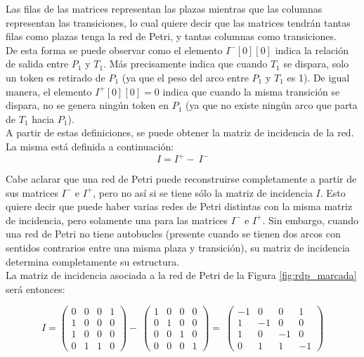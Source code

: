 Las filas de las matrices representan las plazas mientras que las columnas representan las transiciones, lo cual quiere decir que las matrices tendrán tantas filas como plazas tenga la red de Petri, y tantas columnas como transiciones.\\

De esta forma se puede observar como el elemento $I^-[0][0]$ indica la relación de salida entre $P_1$ y $T_1$. Más precisamente indica que cuando $T_1$ se dispara, solo un token es retirado de $P_1$ (ya que el peso del arco entre $P_1$ y $T_1$ es 1). De igual manera, el elemento $I^+[0][0] = 0$ indica que cuando la misma transición se dispara, no se genera ningún token en $P_1$ (ya que no existe ningún arco que parta de $T_1$ hacia $P_1$).\\

A partir de estas definiciones, se puede obtener la matriz de incidencia de la red. La misma está definida a continuación:\\

\begin{equation} I = I^+ -\ I^- \end{equation}

Cabe aclarar que una red de Petri puede reconstruirse completamente a partir de sus matrices $I^-$ e $I^+$, pero no así si se tiene sólo la matriz de incidencia $I$. Esto quiere decir que puede haber varias redes de Petri distintas con la misma matriz de incidencia, pero solamente una para las matrices $I^-$ e $I^+$. Sin embargo, cuando una red de Petri no tiene autobucles (presente cuando se tienen dos arcos con sentidos contrarios entre una misma plaza y transición), su matriz de incidencia determina completamente su estructura.\\

La matriz de incidencia asociada a la red de Petri de la Figura \ref{fig:rdp_marcada} será entonces:

\begin{equation}
I =
    \begin{pmatrix}
        0 & 0 & 0 & 1\\
        1 & 0 & 0 & 0\\
        1 & 0 & 0 & 0\\
        0 & 1 & 1 & 0
    \end{pmatrix}
-\ 
    \begin{pmatrix}
        1 & 0 & 0 & 0\\
        0 & 1 & 0 & 0\\
        0 & 0 & 1 & 0\\
        0 & 0 & 0 & 1
    \end{pmatrix}
=\ 
    \begin{pmatrix}
        -1 & 0 & 0 & 1\\
        1 & -1 & 0 & 0\\
        1 & 0 & -1 & 0\\
        0 & 1 & 1 & -1
    \end{pmatrix}
\end{equation}

